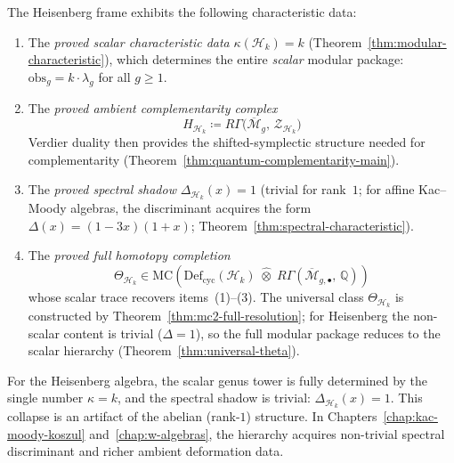 \begin{definition}
\label{def:frame-modular-package}
The Heisenberg frame exhibits the following characteristic data:
\begin{enumerate}
\item The \emph{proved scalar characteristic data}
  $\kappa(\mathcal{H}_k) = k$
  (Theorem~\ref{thm:modular-characteristic}), which determines
  the entire \emph{scalar} modular package: $\mathrm{obs}_g = k
  \cdot \lambda_g$ for all $g \geq 1$.

\item The \emph{proved ambient complementarity complex}
  \begin{equation}\label{eq:frame-ambient}
  H_{\mathcal{H}_k}
  \coloneqq R\Gamma\bigl(\overline{\mathcal{M}}_g,\,
  \mathcal{Z}_{\mathcal{H}_k}\bigr)
  \end{equation}
  Verdier duality then provides the shifted-symplectic
  structure needed for complementarity
  \textup{(}Theorem~\ref{thm:quantum-complementarity-main}\textup{)}.

\item The \emph{proved spectral shadow}
  $\Delta_{\mathcal{H}_k}(x) = 1$
  (trivial for rank~$1$; for affine Kac--Moody algebras, the
  discriminant acquires the form
  $\Delta(x) = (1-3x)(1+x)$;
  Theorem~\ref{thm:spectral-characteristic}).

\item The \emph{proved full homotopy completion}
  \begin{equation}\label{eq:frame-MC-class}
  \Theta_{\mathcal{H}_k} \in
  \mathrm{MC}\!\left(
    \mathrm{Def}_{\mathrm{cyc}}(\mathcal{H}_k)
    \;\widehat{\otimes}\;
    R\Gamma\!\left(\overline{\mathcal{M}}_{g,\bullet},\,
    \mathbb{Q}\right)
  \right)
  \end{equation}
  whose scalar trace recovers items~(1)--(3).
  The universal class $\Theta_{\mathcal{H}_k}$ is constructed
  by Theorem~\ref{thm:mc2-full-resolution}; for Heisenberg
  the non-scalar content is trivial ($\Delta = 1$), so the
  full modular package reduces to the scalar hierarchy
  (Theorem~\ref{thm:universal-theta}).
\end{enumerate}
\end{definition}

For the Heisenberg algebra, the scalar genus tower is fully determined
by the single number $\kappa = k$, and the spectral shadow is trivial:
$\Delta_{\mathcal{H}_k}(x)=1$.  This collapse is an artifact of the
abelian (rank-$1$) structure.  In Chapters~\ref{chap:kac-moody-koszul}
and~\ref{chap:w-algebras}, the hierarchy acquires non-trivial spectral
discriminant and richer ambient deformation data.

